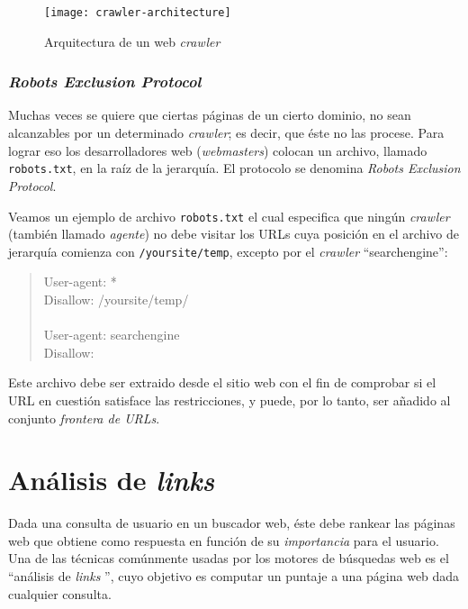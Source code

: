 			\begin{figure}[h]
				\texttt{[image: crawler-architecture]}
				\centering
				\caption{Arquitectura de un web \textit{crawler}}
				\label{fig:crawler-architecture}
			\end{figure}
			
		\subsubsection{\textit{Robots Exclusion Protocol}}
			Muchas veces se quiere que ciertas páginas de un cierto dominio, no sean alcanzables por un determinado \textit{crawler}; es decir, que éste no las procese. Para lograr eso los desarrolladores web (\textit{webmasters}) colocan un archivo, llamado \texttt{robots.txt}, en la raíz de la jerarquía. El protocolo se denomina \textit{Robots Exclusion Protocol}. \par
			
			Veamos un ejemplo de archivo \texttt{robots.txt} el cual especifica que ningún \textit{crawler} (también llamado \textit{agente}) no debe visitar los URLs cuya posición en el archivo de jerarquía comienza con \texttt{/yoursite/temp}, excepto por el \textit{crawler} \enquote{searchengine}:
			\begin{quote}
				\begin{ttfamily}
					User-agent: * \\
					Disallow: /yoursite/temp/ \\ \\
					
					User-agent: searchengine \\
					Disallow:
				\end{ttfamily}
			\end{quote}
			
			Este archivo debe ser extraido desde el sitio web con el fin de comprobar si el URL en cuestión satisface las restricciones, y puede, por lo tanto, ser añadido al conjunto \textit{frontera de URLs}.
			

\section{Análisis de \textit{links}}
	Dada una consulta de usuario en un buscador web, éste debe rankear las páginas web que obtiene como respuesta en función de su \textit{importancia} para el usuario. Una de las técnicas comúnmente usadas por los motores de búsquedas web es el \enquote{análisis de \textit{links} }, cuyo objetivo es computar un puntaje a una página web dada cualquier consulta. \par
	
